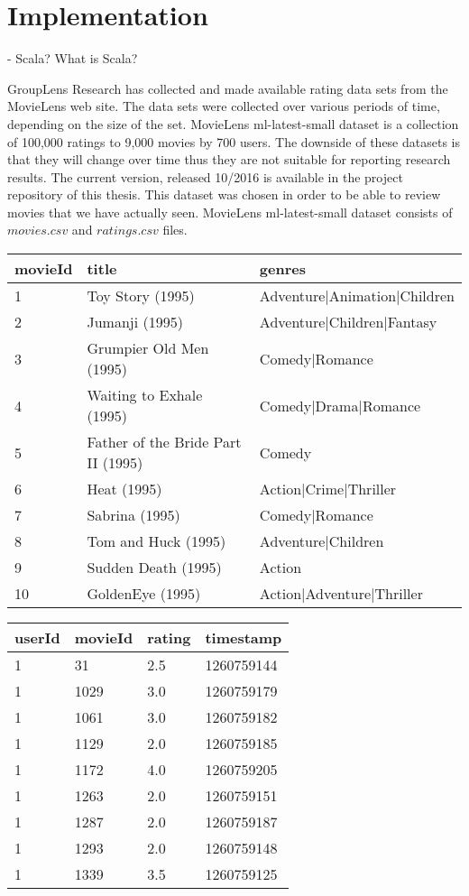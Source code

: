 \documentclass[main.tex]{thesis.tex}
\begin{document}
\chapter{Implementation}

- Scala? What is Scala?

GroupLens Research has collected and made available rating data sets from the MovieLens web site.
The data sets were collected over various periods of time, depending on the size of the set.
MovieLens ml-latest-small dataset is a collection of 100,000 ratings to 9,000 movies by 700 users.
The downside of these datasets is that they will change over time thus they are not suitable for reporting research results.
The current version, released 10/2016 is available in the project repository of this thesis.
This dataset was chosen in order to be able to review movies that we have actually seen.
MovieLens ml-latest-small dataset consists of $movies.csv$ and $ratings.csv$ files.

\begin{tabular}{lll}
	movieId & title & genres \\ \hline
	1 & Toy Story (1995) & Adventure|Animation|Children \\
	2 & Jumanji (1995) & Adventure|Children|Fantasy \\
	3 & Grumpier Old Men (1995) & Comedy|Romance \\
	4 & Waiting to Exhale (1995) & Comedy|Drama|Romance \\
	5 & Father of the Bride Part II (1995) & Comedy \\
	6 & Heat (1995) & Action|Crime|Thriller \\
	7 & Sabrina (1995) & Comedy|Romance \\
	8 & Tom and Huck (1995) & Adventure|Children \\
	9 & Sudden Death (1995) & Action \\
	10 & GoldenEye (1995) & Action|Adventure|Thriller \\
\end{tabular}

\begin{tabular}{llll}
	userId & movieId & rating & timestamp \\ \hline
	1 & 31 & 2.5 & 1260759144 \\
	1 & 1029 & 3.0 & 1260759179 \\
	1 & 1061 & 3.0 & 1260759182 \\
	1 & 1129 & 2.0 & 1260759185 \\
	1 & 1172 & 4.0 & 1260759205 \\
	1 & 1263 & 2.0 & 1260759151 \\
	1 & 1287 & 2.0 & 1260759187 \\
	1 & 1293 & 2.0 & 1260759148 \\
	1 & 1339 & 3.5 & 1260759125 \\
\end{tabular}
\end{document}
